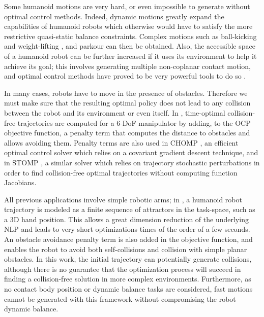 Some humanoid motions are very hard, or even impossible to generate
without optimal control methods. Indeed, dynamic motions greatly
expand the capabilities of humanoid robots which otherwise would have
to satisfy the more restrictive quasi-static balance
constraints. Complex motions such as ball-kicking
\cite{miossec2006development} and weight-lifting
\cite{arisumi2008dynamic}, and parkour \cite{dellin2012framework} can
then be obtained. Also, the accessible space of a humanoid robot can
be further increased if it uses its environment to help it achieve its
goal; this involves generating multiple non-coplanar contact motion,
and optimal control methods have proved to be very powerful tools to
do so \cite{lengagne2011generation}.

\bigskip

In many cases, robots have to move in the presence of
obstacles. Therefore we must make sure that the resulting optimal
policy does not lead to any collision between the robot and its
environment or even itself. In \cite{dubowsky1986time}, time-optimal
collision-free trajectories are computed for a 6-DoF manipulator by
adding, to the OCP objective function, a penalty term that computes
the distance to obstacles and allows avoiding them. Penalty terms
are also used in \textsc{CHOMP} \cite{ratliff2009chomp}, an efficient
optimal control solver which relies on a covariant gradient descent
technique, and in \textsc{STOMP} \cite{Kalakrishnan2011}, a similar
solver which relies on trajectory stochastic perturbations in order to
find collision-free optimal trajectories without computing function
Jacobians.

All previous applications involve simple robotic arms; in
\cite{Toussaint2007}, a humanoid robot trajectory is modeled as a
finite sequence of attractors in the task-space, such as a 3D hand
position. This allows a great dimension reduction of the underlying
NLP and leads to very short optimizations times of the order of a few
seconds. An obstacle avoidance penalty term is also added in the
objective function, and enables the robot to avoid both
self-collisions and collision with simple planar obstacles. In this
work, the initial trajectory can potentially generate collisions,
although there is no guarantee that the optimization process will
succeed in finding a collision-free solution in more complex
environments. Furthermore, as no contact body position or dynamic
balance tasks are considered, fast motions cannot be generated with
this framework without compromising the robot dynamic balance.

